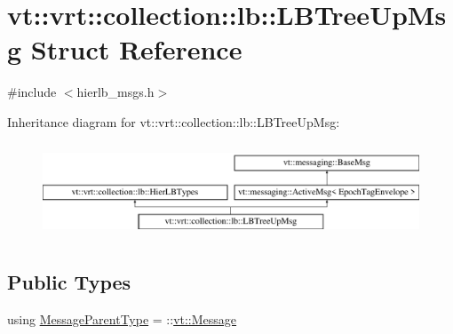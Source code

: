 \hypertarget{structvt_1_1vrt_1_1collection_1_1lb_1_1_l_b_tree_up_msg}{}\section{vt\+:\+:vrt\+:\+:collection\+:\+:lb\+:\+:L\+B\+Tree\+Up\+Msg Struct Reference}
\label{structvt_1_1vrt_1_1collection_1_1lb_1_1_l_b_tree_up_msg}


{\ttfamily \#include $<$hierlb\+\_\+msgs.\+h$>$}

Inheritance diagram for vt\+:\+:vrt\+:\+:collection\+:\+:lb\+:\+:L\+B\+Tree\+Up\+Msg\+:\begin{figure}[H]
\begin{center}
\leavevmode
\includegraphics[height=2.847458cm]{structvt_1_1vrt_1_1collection_1_1lb_1_1_l_b_tree_up_msg}
\end{center}
\end{figure}
\subsection*{Public Types}
\begin{DoxyCompactItemize}
\item 
using \hyperlink{structvt_1_1vrt_1_1collection_1_1lb_1_1_l_b_tree_up_msg_a476415f74c2143a0761fe8cca883f5b6}{Message\+Parent\+Type} = \+::\hyperlink{namespacevt_a3a3ddfef40b4c90915fa43cdd5f129ea}{vt\+::\+Message}
\end{DoxyCompactItemize}
